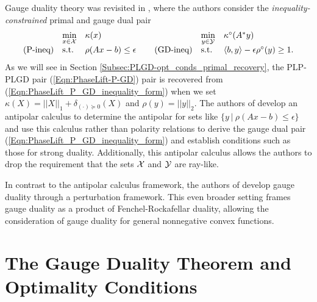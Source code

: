 Gauge duality theory was revisited in \cite{DBLP:journals/siamjo/FriedlanderMP14}, where the authors consider the \textit{inequality-constrained} primal and gauge dual pair
\begin{equation} 			\label{Eqn:PhaseLift_P_GD_inequality_form}
\begin{array}{lllllll}
	&	\min\limits_{\substack{x \in {\mathcal X}}}
		&	\kappa(x)
			&
				&	\min\limits_{\substack{y \in {\mathcal Y}}}
					&	\kappa^\circ(A^*y)
						\\
\textnormal{(P-ineq)}
	&	\textnormal{s.t.}
		& 	\rho(Ax-b) \leq \epsilon
			&	\hspace{0.4cm} 	\textnormal{(GD-ineq)}
				&	\textnormal{s.t.}
					&	\langle b, y \rangle - \epsilon \rho^\circ(y) \geq 1.
\end{array}
\end{equation}
As we will see in Section \ref{Subsec:PLGD-opt_conds_primal_recovery}, the PLP-PLGD pair (\ref{Eqn:PhaseLift-P-GD}) pair is recovered from (\ref{Eqn:PhaseLift_P_GD_inequality_form}) when we set $\kappa(X) = ||X||_1 + \delta_{(\cdot) \succeq 0}(X)$ and $\rho(y) = ||y||_2$.  The authors of \cite{DBLP:journals/siamjo/FriedlanderMP14} develop an antipolar calculus to determine the antipolar for sets like $\{ y \ | \ \rho(Ax-b) \leq \epsilon \}$ and use this calculus rather than polarity relations to derive the gauge dual pair (\ref{Eqn:PhaseLift_P_GD_inequality_form}) and establish conditions such as those for strong duality.  Additionally, this antipolar calculus allows the authors to drop the requirement that the sets ${\mathcal X}$ and ${\mathcal Y}$ are ray-like.

In contrast to the antipolar calculus framework, the authors of \cite{aravkin2017foundations} develop gauge duality through a perturbation framework.  This even broader setting frames gauge duality as a product of Fenchel-Rockafellar duality, allowing the consideration of gauge duality for 
general nonnegative convex functions.









\section{The Gauge Duality Theorem and Optimality Conditions} 			\label{Subsec:PLGD-theory}




